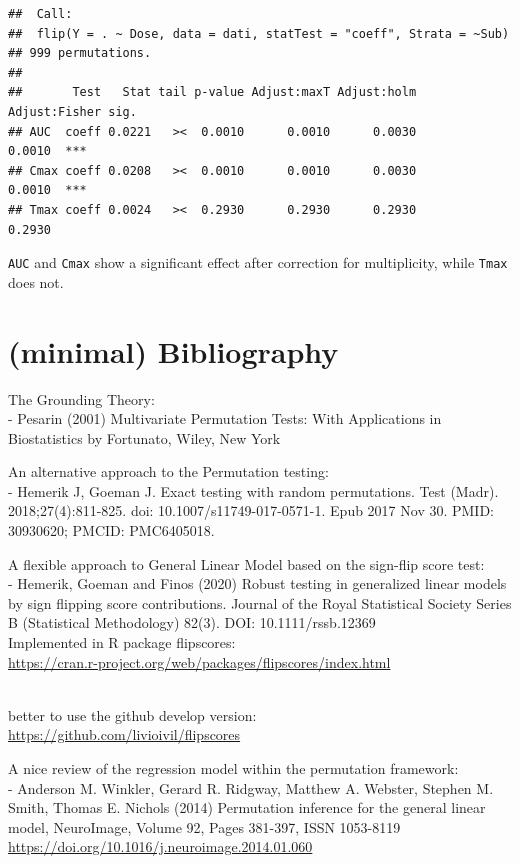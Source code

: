 \documentclass[
]{article}
\begin{document}
\begin{verbatim}
##  Call:
##  flip(Y = . ~ Dose, data = dati, statTest = "coeff", Strata = ~Sub) 
## 999 permutations.
## 
##       Test   Stat tail p-value Adjust:maxT Adjust:holm Adjust:Fisher sig.
## AUC  coeff 0.0221   ><  0.0010      0.0010      0.0030        0.0010  ***
## Cmax coeff 0.0208   ><  0.0010      0.0010      0.0030        0.0010  ***
## Tmax coeff 0.0024   ><  0.2930      0.2930      0.2930        0.2930
\end{verbatim}

\texttt{AUC} and \texttt{Cmax} show a significant effect after
correction for multiplicity, while \texttt{Tmax} does not.

\hypertarget{minimal-bibliography}{%
\section{(minimal) Bibliography}\label{minimal-bibliography}}

The Grounding Theory:\\
- Pesarin (2001) Multivariate Permutation Tests: With Applications in
Biostatistics by Fortunato, Wiley, New York

An alternative approach to the Permutation testing:\\
- Hemerik J, Goeman J. Exact testing with random permutations. Test
(Madr). 2018;27(4):811-825. doi: 10.1007/s11749-017-0571-1. Epub 2017
Nov 30. PMID: 30930620; PMCID: PMC6405018.

A flexible approach to General Linear Model based on the sign-flip score
test:\\
- Hemerik, Goeman and Finos (2020) Robust testing in generalized linear
models by sign flipping score contributions. Journal of the Royal
Statistical Society Series B (Statistical Methodology) 82(3). DOI:
10.1111/rssb.12369\\
Implemented in R package flipscores:\\
\url{https://cran.r-project.org/web/packages/flipscores/index.html}\strut \\
better to use the github develop version:\\
\url{https://github.com/livioivil/flipscores}

A nice review of the regression model within the permutation
framework:\\
- Anderson M. Winkler, Gerard R. Ridgway, Matthew A. Webster, Stephen M.
Smith, Thomas E. Nichols (2014) Permutation inference for the general
linear model, NeuroImage, Volume 92, Pages 381-397, ISSN 1053-8119
\url{https://doi.org/10.1016/j.neuroimage.2014.01.060}
\end{document}
